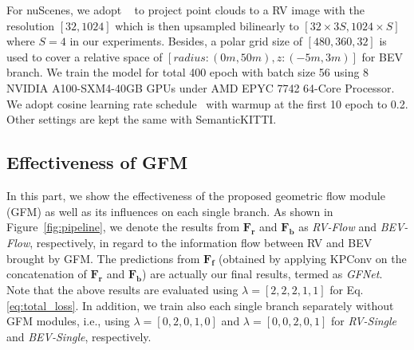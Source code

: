 For nuScenes, we adopt ~\cite{milioto2019rangenet++} to project point clouds to a RV image with the resolution $[32, 1024]$ which is then upsampled bilinearly to $[32\times3S, 1024\times S]$ where $S=4$ in our experiments. Besides, a polar grid size of $[480, 360, 32]$ is used to cover a relative space of $[radius: (0m, 50m), z: (-5m, 3m)]$ for BEV branch. We train the model for total 400 epoch with batch size 56 using 8 NVIDIA A100-SXM4-40GB GPUs under AMD EPYC 7742 64-Core Processor. We adopt cosine learning rate schedule~\citep{loshchilov2016sgdr} with warmup at the first 10 epoch to 0.2. Other settings are kept the same with SemanticKITTI.



\subsection{Effectiveness of GFM}

In this part, we show the effectiveness of the proposed geometric flow module (GFM) as well as its influences on each single branch. As shown in Figure~\ref{fig:pipeline}, we denote the results from $\mathbf{F_r}$ and $\mathbf{F_b}$ as \textit{RV-Flow} and \textit{BEV-Flow}, respectively, in regard to the information flow between RV and BEV brought by GFM. The predictions from $\mathbf{F_f}$ (obtained by applying KPConv on the concatenation of $\mathbf{F_r}$ and $\mathbf{F_b}$) are actually our final results, termed as \textit{GFNet}. Note that the above results are evaluated using $\lambda=[2,2,2,1,1]$ for Eq.\ref{eq:total_loss}. In addition, we train also each single branch separately without GFM modules, i.e., using $\lambda=[0,2,0,1,0]$ and $\lambda=[0,0,2,0,1]$ for \textit{RV-Single} and \textit{BEV-Single}, respectively.

